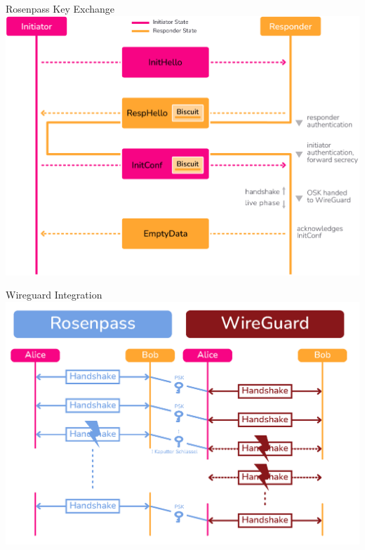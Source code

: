 \documentclass{rosenpass-beamer}
\begin{document}

\begin{frame}{Rosenpass Key Exchange}
  \includegraphics[height=.9\textheight]{graphics/rosenpass-wp-key-exchange-protocol-rgb.pdf}
\end{frame}


\begin{frame}{Wireguard Integration}
  \includegraphics[height=.9\textheight]{assets/rosenpass-wireguard.png}
\end{frame}
\end{document}
